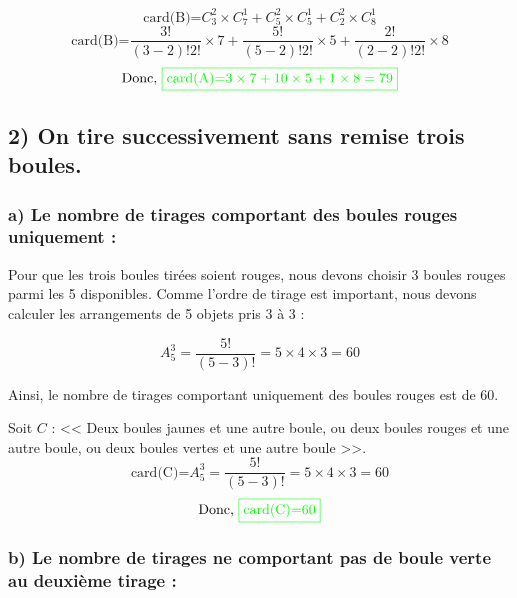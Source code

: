 \documentclass[12pt]{article}
\begin{document}
\[\text{card(B)=}C_{3}^{2}\times C_{7}^{1} + C_{5}^{2}\times C_{5}^{1} + C_{2}^{2}\times C_{8}^{1}\]
\[\text{card(B)=}\frac{3!}{(3-2)!2!}\times 7 +\frac{5!}{(5-2)!2!}\times 5 + \frac{2!}{(2-2)!2!}\times 8\]
\[\text{Donc, }\color{green}{\boxed{\text{card(A)=}3\times 7 +10\times 5 + 1\times 8=79}}\]

\subsection*{2) On tire successivement sans remise trois boules.}

\subsubsection*{a) Le nombre de tirages comportant des boules rouges uniquement :}

Pour que les trois boules tirées soient rouges, nous devons choisir 3 boules rouges parmi les 5 disponibles. Comme l'ordre de tirage est important, nous devons calculer les arrangements de 5 objets pris 3 à 3 :

\[
A_{5}^{3} = \frac{5!}{(5-3)!} = 5 \times 4 \times 3 = 60
\]

Ainsi, le nombre de tirages comportant uniquement des boules rouges est de 60.

\textbf{\color{green}{Autrement dit :}}

Soit $C$ : << Deux boules jaunes et une autre boule, ou deux boules rouges et une autre boule, ou deux boules vertes et une autre boule >>.
\[\text{card(C)=}A_{5}^{3} = \frac{5!}{(5-3)!} = 5 \times 4 \times 3 = 60\]
\[\text{Donc, }\color{green}{\boxed{\text{card(C)=}60}}\]
\subsubsection*{b) Le nombre de tirages ne comportant pas de boule verte au deuxième tirage :}
\end{document}
